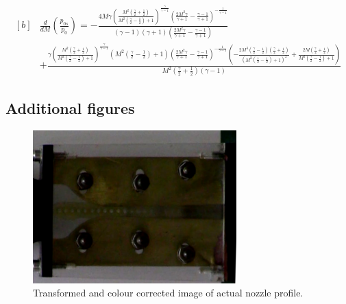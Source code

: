 \documentclass{article}
\begin{document}
\begin{equation}
    \begin{aligned}[b]
    & \frac{d}{dM}\left( \frac{p_{0s}}{p_0} \right) = - \frac{4 M \gamma \left(\frac{M^{2} \left(\frac{\gamma}{2} + \frac{1}{2}\right)}{M^{2} \left(\frac{\gamma}{2} - \frac{1}{2}\right) + 1}\right)^{\frac{\gamma}{\gamma - 1}} \left(\frac{2 M^{2} \gamma}{\gamma + 1} - \frac{\gamma - 1}{\gamma + 1}\right)^{- \frac{1}{\gamma - 1}}}{\left(\gamma - 1\right) \left(\gamma + 1\right) \left(\frac{2 M^{2} \gamma}{\gamma + 1} - \frac{\gamma - 1}{\gamma + 1}\right)} \\
    & + \frac{\gamma \left(\frac{M^{2} \left(\frac{\gamma}{2} + \frac{1}{2}\right)}{M^{2} \left(\frac{\gamma}{2} - \frac{1}{2}\right) + 1}\right)^{\frac{\gamma}{\gamma - 1}} \left(M^{2} \left(\frac{\gamma}{2} - \frac{1}{2}\right) + 1\right) \left(\frac{2 M^{2} \gamma}{\gamma + 1} - \frac{\gamma - 1}{\gamma + 1}\right)^{- \frac{1}{\gamma - 1}} \left(- \frac{2 M^{3} \left(\frac{\gamma}{2} - \frac{1}{2}\right) \left(\frac{\gamma}{2} + \frac{1}{2}\right)}{\left(M^{2} \left(\frac{\gamma}{2} - \frac{1}{2}\right) + 1\right)^{2}} + \frac{2 M \left(\frac{\gamma}{2} + \frac{1}{2}\right)}{M^{2} \left(\frac{\gamma}{2} - \frac{1}{2}\right) + 1}\right)}{M^{2} \left(\frac{\gamma}{2} + \frac{1}{2}\right) \left(\gamma - 1\right)}
    \end{aligned}
    \label{eqn:dp0sr_dm}
\end{equation}


\subsection{Additional figures}

\begin{figure}[H]
    \centering
    \includegraphics[width=0.7\textwidth]{actual_nozzle_profile.png}
    \caption{Transformed and colour corrected image of actual nozzle profile.}
    \label{fig:actual_nozzle}
\end{figure}
\end{document}
